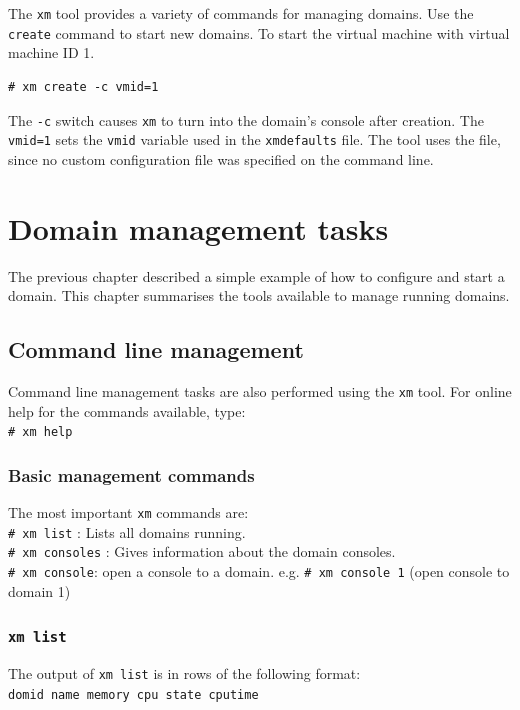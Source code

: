 \documentclass[11pt,twoside,final,openright]{xenstyle}
\begin{document}
The {\tt xm} tool provides a variety of commands for managing domains.
Use the {\tt create} command to start new domains.  To start the
virtual machine with virtual machine ID 1.

\begin{verbatim}
# xm create -c vmid=1
\end{verbatim}

The {\tt -c} switch causes {\tt xm} to turn into the domain's console
after creation.  The {\tt vmid=1} sets the {\tt vmid} variable used in
the {\tt xmdefaults} file.  The tool uses the
 file, since no custom configuration file
was specified on the command line.

\chapter{Domain management tasks}

The previous chapter described a simple example of how to configure
and start a domain.  This chapter summarises the tools available to
manage running domains.

\section{Command line management}

Command line management tasks are also performed using the {\tt xm}
tool.  For online help for the commands available, type:\\
\verb_# xm help_

\subsection{Basic management commands}

The most important {\tt xm} commands are: \\
\verb_# xm list_ : Lists all domains running. \\
\verb_# xm consoles_ : Gives information about the domain consoles. \\
\verb_# xm console_: open a console to a domain.
e.g. \verb_# xm console 1_ (open console to domain 1)

\subsection{\tt xm list}

The output of {\tt xm list} is in rows of the following format:\\
\verb_domid name memory cpu state cputime_
\end{document}
